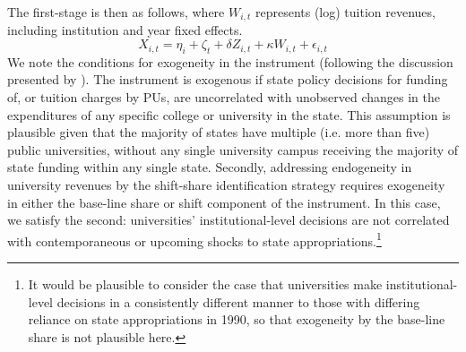 \documentclass[notitlepage,12pt]{article}
\begin{document}
The first-stage is then as follows, where $W_{i,t}$ represents (log) tuition revenues, including institution and year fixed effects.
\begin{equation}
    \label{eqn:firststage}
    X_{i,t} = \eta_i + \zeta_t + \delta Z_{i,t} + \kappa W_{i,t} + \epsilon_{i,t}
\end{equation}
We note the conditions for exogeneity in the instrument (following the discussion presented by \citealt{NBERw27885}).
The instrument is exogenous if state policy decisions for funding of, or tuition charges by PUs, are uncorrelated with unobserved changes in the expenditures of any specific college or university in the state.
This assumption is plausible given that the majority of states have multiple (i.e. more than five) public universities, without any single university campus receiving the majority of state funding within any single state.
Secondly, addressing endogeneity in university revenues by the shift-share identification strategy requires exogeneity in either the base-line share or shift component of the instrument.
In this case, we satisfy the second: universities' institutional-level decisions are not correlated with contemporaneous or upcoming shocks to state appropriations.\footnote{
    It would be plausible to consider the case that universities make institutional-level decisions in a consistently different manner to those 
    with differing reliance on state appropriations in 1990, so that exogeneity by the base-line share is not plausible here.
}
\end{document}
